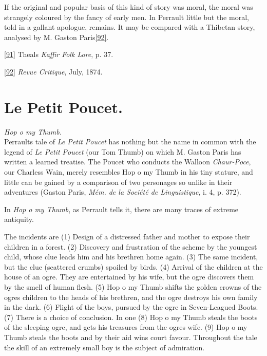 \documentclass[14pt,a4paper]{memoir}
\begin{document}
If the original and popular basis of this kind of story was moral, the
moral was strangely coloured by the fancy of early men. In Perrault
little but the moral, told in a gallant apologue, remains. It may be
compared with a Thibetan story, analysed by M. Gaston
Paris\protect\hypertarget{4533318093929944247_33931-h-1.htm.xhtmlux5cux23FNanchor_92}{}{}\protect\hyperlink{4533318093929944247_33931-h-1.htm.xhtmlux5cux23Footnote_92}{{[}92{]}}.

\protect\hypertarget{4533318093929944247_33931-h-1.htm.xhtmlux5cux23Footnote_91}{}{}\protect\hyperlink{4533318093929944247_33931-h-1.htm.xhtmlux5cux23FNanchor_91}{{{[}91{]}}}
Theal\textquotesingle s \emph{Kaffir Folk Lore}, p. 37.

\protect\hypertarget{4533318093929944247_33931-h-1.htm.xhtmlux5cux23Footnote_92}{}{}\protect\hyperlink{4533318093929944247_33931-h-1.htm.xhtmlux5cux23FNanchor_92}{{{[}92{]}}}
\emph{Revue Critique}, July, 1874.

\section{Le Petit Poucet.}

\emph{Hop o\textquotesingle{} my Thumb.} \\

Perrault\textquotesingle s tale of \emph{Le Petit Poucet} has nothing
but the name in common with the legend of \emph{Le Petit Poucet} (our
\textquotesingle Tom Thumb\textquotesingle) on which M. Gaston Paris has
written a learned treatise. The Poucet who conducts the Walloon
\emph{Chaur-Poce}, our \textquotesingle Charles\textquotesingle s
Wain,\textquotesingle{} merely resembles Hop o\textquotesingle{} my
Thumb in his tiny stature, and little can be gained by a comparison of
two personages so unlike in their adventures (Gaston Paris, \emph{Mém.
de la Société de Linguistique}, i. 4, p. 372).

In \emph{Hop o\textquotesingle{} my Thumb}, as Perrault tells it, there
are many traces of extreme antiquity.

The incidents are (1) Design of a distressed father and mother to expose
their children in a forest. (2) Discovery and frustration of the scheme
by the youngest child, whose clue leads him and his brethren home again.
(3) The same incident, but the clue (scattered crumbs) spoiled by birds.
(4) Arrival of the children at the house of an ogre. They are
entertained by his wife, but the ogre discovers them by the smell of
human flesh. (5) Hop o\textquotesingle{} my Thumb shifts the golden
crowns of the ogre\textquotesingle s children to the heads of his
brethren, and the ogre destroys his own family in the dark. (6) Flight
of the boys, pursued by the ogre in Seven-Leagued Boots. (7) There is a
choice of conclusion. In one (8) Hop o\textquotesingle{} my Thumb steals
the boots of the sleeping ogre, and gets his treasures from the
ogre\textquotesingle s wife. (9) Hop o\textquotesingle{} my Thumb steals
the boots and by their aid wins court favour. Throughout the tale the
skill of an extremely small boy is the subject of admiration.
\end{document}
